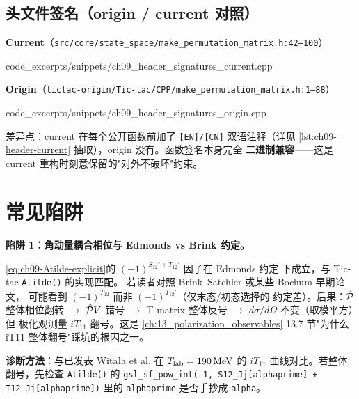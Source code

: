 \subsection{头文件签名（origin / current 对照）}
\label{subsec:ch09-header}

\noindent\textbf{Current}（\texttt{src/core/state\_space/make\_permutation\_matrix.h:42--100}）


{code_excerpts/snippets/ch09_header_signatures_current.cpp}

\noindent\textbf{Origin}（\texttt{tictac-origin/Tic-tac/CPP/make\_permutation\_matrix.h:1--88}）


{code_excerpts/snippets/ch09_header_signatures_origin.cpp}

差异点：current 在每个公开函数前加了 \texttt{[EN]/[CN]} 双语注释（详见
\cref{lst:ch09-header-current} 抽取），origin 没有。函数签名本身完全
\textbf{二进制兼容}——这是 current 重构时刻意保留的"对外不破坏"约束。

\section{常见陷阱}
\label{sec:ch09-pitfalls}

\begin{pitfallbox}
\textbf{陷阱 1：角动量耦合相位与 Edmonds vs Brink 约定。}

\eqref{eq:ch09-Atilde-explicit}的 \((-1)^{S_{12}'+T_{12}'}\) 因子在 Edmonds
约定 \cite{Edmonds1957} 下成立，与 Tic-tac \texttt{Atilde()} 的实现匹配。
若读者对照 Brink--Satchler \cite{BrinkSatchler1968} 或某些 Bochum 早期论文，
可能看到 \((-1)^{T_{12}}\) 而非 \((-1)^{T_{12}'}\)（仅末态/初态选择的
约定差）。后果：\(\hat{\mathcal{P}}\) 整体相位翻转 \(\to\) \(\hat{\mathcal{P}} V\) 错号 \(\to\)
T-matrix 整体反号 \(\to\) \(d\sigma/d\Omega\) 不变（取模平方）但
极化观测量 \(iT_{11}\) 翻号。这是 \cref{ch:13_polarization_observables} 13.7
节"为什么 iT11 整体翻号"踩坑的根因之一。

\textbf{诊断方法}：与已发表 Witała et al. \cite{Witala2003} 在
\({T_{\text{lab}}}=190\,\mathrm{MeV}\) 的 \(iT_{11}\) 曲线对比。若整体翻号，先检查
\texttt{Atilde()} 的 \texttt{gsl\_sf\_pow\_int(-1, S12\_Jj[alphaprime] + T12\_Jj[alphaprime])}
里的 \texttt{alphaprime} 是否手抄成 \texttt{alpha}。
\end{pitfallbox}

